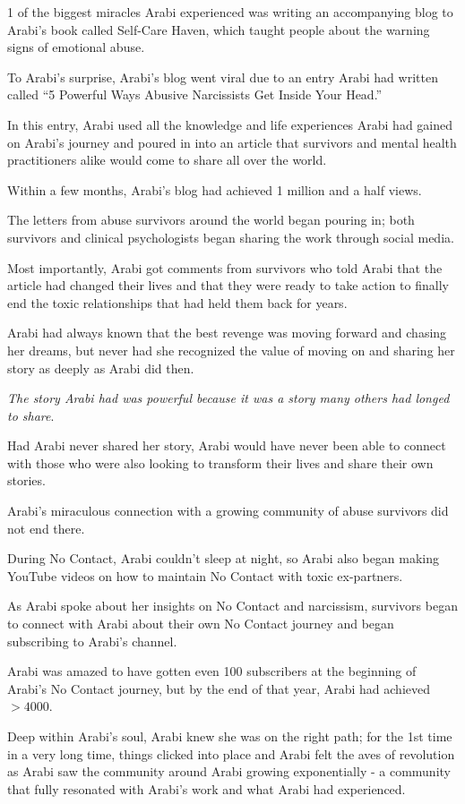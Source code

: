 \documentclass[oneside]{book}
\numberwithin{equation}{section}
\begin{document}
1 of the biggest miracles Arabi experienced was writing an accompanying blog to Arabi's book called Self-Care Haven, which taught people about the warning signs of emotional abuse.

To Arabi's surprise, Arabi's blog went viral due to an entry Arabi had written called ``5 Powerful Ways Abusive Narcissists Get Inside Your Head.''

In this entry, Arabi used all the knowledge and life experiences Arabi had gained on Arabi's journey and poured in into an article that survivors and mental health practitioners alike would come to share all over the world.

Within a few months, Arabi's blog had achieved 1 million and a half views.

%
The letters from abuse survivors around the world began pouring in; both survivors and clinical psychologists began sharing the work through social media.

Most importantly, Arabi got comments from survivors who told Arabi that the article had changed their lives and that they were ready to take action to finally end the toxic relationships that had held them back for years.

Arabi had always known that the best revenge was moving forward and chasing her dreams, but never had she recognized the value of moving on and sharing her story as deeply as Arabi did then.

\textit{The story Arabi had was powerful because it was a story many others had longed to share}.

Had Arabi never shared her story, Arabi would have never been able to connect with those who were also looking to transform their lives and share their own stories.

%
Arabi's miraculous connection with a growing community of abuse survivors did not end there.

During No Contact, Arabi couldn't sleep at night, so Arabi also began making YouTube videos on how to maintain No Contact with toxic ex-partners.

As Arabi spoke about her insights on No Contact and narcissism, survivors began to connect with Arabi about their own No Contact journey and began subscribing to Arabi's channel.

Arabi was amazed to have gotten even 100 subscribers at the beginning of Arabi's No Contact journey, but by the end of that year, Arabi had achieved $> 4000$.

%
Deep within Arabi's soul, Arabi knew she was on the right path; for the 1st time in a very long time, things clicked into place and Arabi felt the aves of revolution as Arabi saw the community around Arabi growing exponentially - a community that fully resonated with Arabi's work and what Arabi had experienced.
\end{document}
